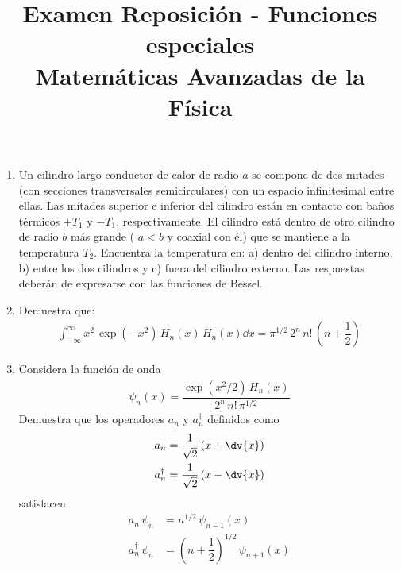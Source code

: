 
\marginsize{1cm}{1cm}{2cm}{2cm}
\renewcommand{\headrulewidth}{0.5pt}
\setlength{\headheight}{30pt} 
\author{}
\date{}
\title{Examen Reposición - Funciones especiales \\ \large{Matemáticas Avanzadas de la Física}\vspace{-20pt}}

\maketitle
\fontsize{14}{14}\selectfont
\begin{enumerate}
\item Un cilindro largo conductor de calor de radio $a$ se compone de dos mitades (con secciones transversales semicirculares) con un espacio infinitesimal entre ellas. Las mitades superior e inferior del cilindro están en contacto con baños térmicos $+T_{1}$ y $-T_{1}$, respectivamente. El cilindro está dentro de otro cilindro de radio $b$ más grande ( $a < b$ y coaxial con él) que se mantiene a la temperatura $T_{2}$. Encuentra la temperatura en: a) dentro del cilindro interno, b) entre los dos cilindros y c) fuera del cilindro externo. Las respuestas deberán de expresarse con las funciones de Bessel.
\item Demuestra que:
\begin{align*}
\int_{-\infty}^{\infty} x^{2} \, \exp(-x^{2}) \, H_{n} (x) \, H_{n} (x) \dd{x} = \pi^{1/2} \, 2^{n} \, n! \,  \left(n + \dfrac{1}{2} \right)
\end{align*}
\item Considera la función de onda
\begin{align*}
\psi_{n} (x) = \dfrac{\exp(x^{2}/2) \, H_{n} (x)}{2^{n} \, n! \, \pi^{1/2}}
\end{align*}
Demuestra que  los operadores $a_{n}$ y $a_{n}^{\dagger}$ definidos como
\begin{align*}
a_{n} &= \dfrac{1}{\sqrt{2}} \left( x + \dv{x} \right) \\
a_{n}^{\dagger} &= \dfrac{1}{\sqrt{2}} \left( x - \dv{x} \right)
\end{align*}
satisfacen 
\begin{align*}
a_{n} \, \psi_{n} &= n^{1/2} \, \psi_{n-1} (x) \\[1em]
a_{n}^{\dagger} \, \psi_{n} &= \left(n + \dfrac{1}{2} \right)^{1/2} \, \psi_{n+1} (x)

\end{align*}
\end{enumerate}
